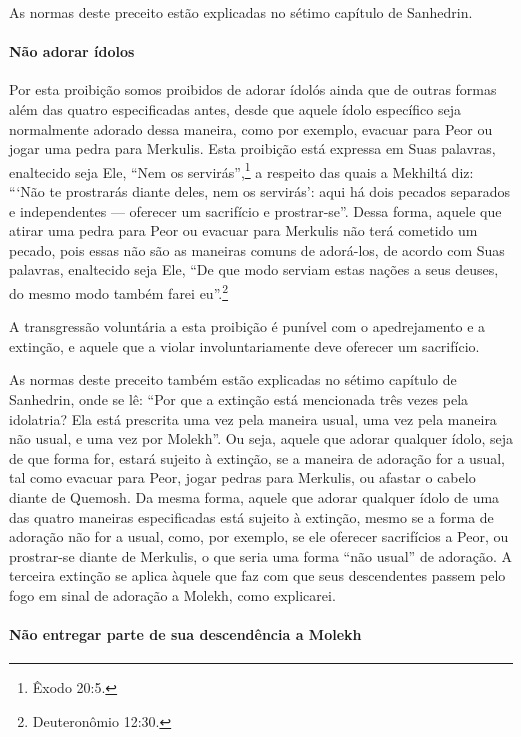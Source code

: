 As normas deste preceito estão explicadas no sétimo capítulo de Sanhedrin.

\paragraph{Não adorar ídolos}

Por esta proibição somos proibidos de adorar ídolós ainda que de outras
formas além das quatro especificadas antes, desde que aquele ídolo
específico seja normalmente adorado dessa maneira, como por exemplo,
evacuar para Peor ou jogar uma pedra para Merkulis. Esta proibição está
expressa em Suas palavras, enaltecido seja Ele, ``Nem os servirás'',\footnote{Êxodo 20:5.} a respeito das quais a Mekhiltá diz: ```Não te prostrarás
diante deles, nem os servirás': aqui há dois pecados separados e
independentes --- oferecer um sacrifício e prostrar-se''. Dessa forma,
aquele que atirar uma pedra para Peor ou evacuar para Merkulis não terá cometido um pecado, pois essas não são as maneiras comuns
de adorá-los, de acordo com Suas palavras, enaltecido seja Ele, ``De que
modo serviam estas nações a seus deuses, do mesmo modo também farei eu''.\footnote{Deuteronômio 12:30.}

A transgressão voluntária a esta proibição é punível com o apedrejamento
e a extinção, e aquele que a violar involuntariamente deve oferecer um
sacrifício.

As normas deste preceito também estão explicadas no sétimo capítulo de
Sanhedrin, onde se lê: ``Por que a extinção está mencionada três vezes
pela idolatria? Ela está prescrita uma vez pela maneira usual, uma vez
pela maneira não usual, e uma vez por Molekh''. Ou seja, aquele que
adorar qualquer ídolo, seja de que forma for, estará sujeito à extinção,
se a maneira de adoração for a usual, tal como evacuar para Peor, jogar
pedras para Merkulis, ou afastar o cabelo diante de Quemosh. Da mesma
forma, aquele que adorar qualquer ídolo de uma das quatro maneiras
especificadas está sujeito à extinção, mesmo se a forma de adoração não
for a usual, como, por exemplo, se ele oferecer sacrifícios a Peor, ou
prostrar-se diante de Merkulis, o que seria uma forma ``não usual'' de
adoração. A terceira extinção se aplica àquele que faz com que seus
descendentes passem pelo fogo em sinal de adoração a Molekh, como
explicarei.

\paragraph{Não entregar parte de sua descendência a Molekh}

